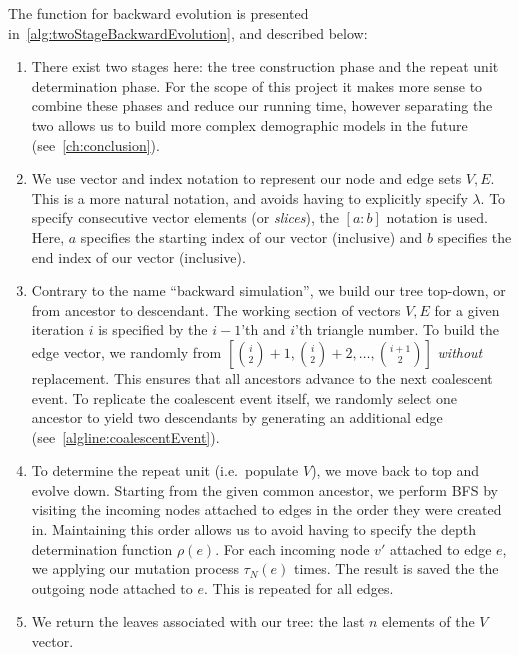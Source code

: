 The function for backward evolution is presented in~\autoref{alg:twoStageBackwardEvolution}, and described below:
\begin{enumerate}
    \item There exist two stages here: the tree construction phase and the repeat unit determination phase.
        For the scope of this project it makes more sense to combine these phases and reduce our running time, however
        separating the two allows us to build more complex demographic models in the future
        (see~\autoref{ch:conclusion}).
    \item We use vector and index notation to represent our node and edge sets $V, E$.
        This is a more natural notation, and avoids having to explicitly specify $\lambda$.
        To specify consecutive vector elements (or \emph{slices}), the $[a:b]$ notation is used.
        Here, $a$ specifies the starting index of our vector (inclusive) and $b$ specifies the end index of our
        vector (inclusive).
    \item Contrary to the name ``backward simulation'', we build our tree top-down, or from ancestor to descendant.
        The working section of vectors $V, E$ for a given iteration $i$ is specified by the $i - 1$'th and $i$'th
        triangle number.
        To build the edge vector, we randomly from $\left[\binom{i}{2} + 1, \binom{i}{2} + 2, \ldots,
        \binom{i + 1}{2}\right]$
        \emph{without} replacement.
        This ensures that all ancestors advance to the next coalescent event.
        To replicate the coalescent event itself, we randomly select one ancestor to yield two descendants by generating
        an additional edge (see~\autoref{algline:coalescentEvent}).
    \item To determine the repeat unit (i.e.\ populate $V$), we move back to top and evolve down.
        Starting from the given common ancestor, we perform BFS by visiting the incoming nodes attached to edges in
        the order they were created in.
        Maintaining this order allows us to avoid having to specify the depth determination function $\rho(e)$.
        For each incoming node $v'$ attached to edge $e$, we applying our mutation process $\tau_N(e)$ times.
        The result is saved the the outgoing node attached to $e$.
        This is repeated for all edges.
    \item We return the leaves associated with our tree: the last $n$ elements of the $V$ vector.
\end{enumerate}

